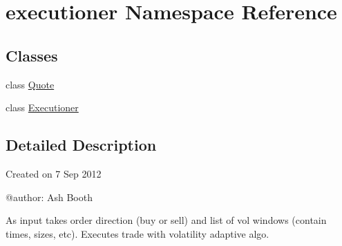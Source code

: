 \hypertarget{namespaceexecutioner}{\section{executioner Namespace Reference}
\label{namespaceexecutioner}
}
\subsection*{Classes}
\begin{DoxyCompactItemize}
\item 
class \hyperlink{classexecutioner_1_1_quote}{Quote}
\item 
class \hyperlink{classexecutioner_1_1_executioner}{Executioner}
\end{DoxyCompactItemize}


\subsection{Detailed Description}
\begin{DoxyVerb}Created on 7 Sep 2012

@author: Ash Booth

As input takes order direction (buy or sell)
and list of vol windows (contain times, sizes, 
etc).
Executes trade with volatility adaptive algo.\end{DoxyVerb}
 